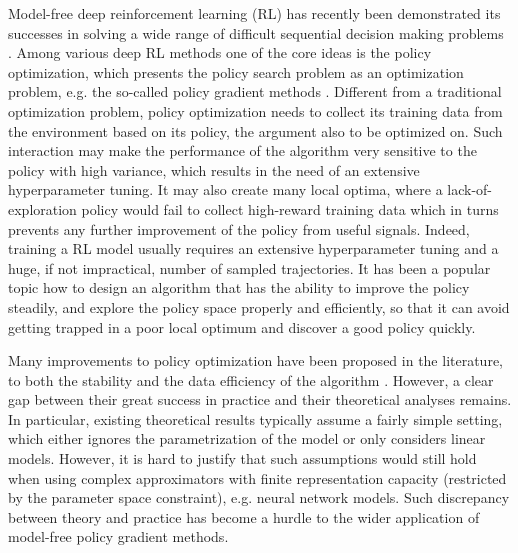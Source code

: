 Model-free deep reinforcement learning (RL) has recently been demonstrated its successes in solving a wide range of difficult sequential decision making problems \citep{schulman2015trust,mnih2015human,silver2016mastering}.
Among various deep RL methods one of the core ideas is the policy optimization, which presents the policy search problem as an optimization problem, e.g. the so-called policy gradient methods \citep{williams1991function,williams1992simple,sutton1998reinforcement}.
Different from a traditional optimization problem, policy optimization needs to collect its training data from the environment based on its policy, the argument also to be optimized on.
Such interaction may make the performance of the algorithm very sensitive to the policy with high variance, which results in the need of an extensive hyperparameter tuning.
It may also create many local optima, where a lack-of-exploration policy would fail to collect high-reward training data which in turns prevents any further improvement of the policy from useful signals.
Indeed, training a RL model usually requires an extensive hyperparameter tuning and a huge, if not impractical, number of sampled trajectories. 
It has been a popular topic how to design an algorithm that has
the ability to improve the policy steadily, and explore the policy space properly and efficiently, so that it can avoid getting trapped in a poor local optimum and discover a good policy quickly.

Many improvements to policy optimization have been proposed in the literature, to both the stability and the data efficiency of the algorithm \citep{peters2010relative,van2015learning,fox2015taming,schulman2015trust,montgomery2016guided,nachum2017bridging,nachum2017trust,tangkaratt2017guide,abdolmaleki2018maximum,haarnoja2018soft}. 
However, a clear gap between their great success in practice and their theoretical analyses remains.
In particular, existing theoretical results typically assume a fairly simple setting, which either ignores the parametrization of the model or only considers linear models. However, it is hard to justify that such assumptions would still hold when using complex approximators with finite representation capacity (restricted by the parameter space constraint), e.g. neural network models.
Such discrepancy between theory and practice has become a hurdle to the wider application of model-free policy gradient methods. 

